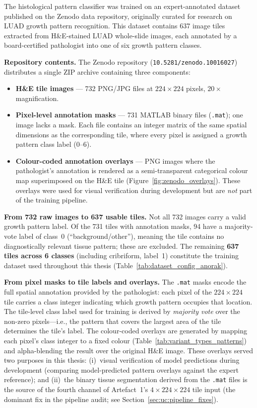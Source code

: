 The histological pattern classifier was trained on an expert-annotated
dataset published on the Zenodo data repository, originally curated for
research on LUAD growth pattern recognition.
This dataset contains 637 image tiles extracted from H\&E-stained LUAD
whole-slide images, each annotated by a board-certified pathologist into
one of six growth pattern classes.

\textbf{Repository contents.}
The Zenodo repository (\texttt{10.5281/zenodo.10016027}) distributes
a single ZIP archive containing three components:
\begin{itemize}
    \item \textbf{H\&E tile images} --- 732 PNG/JPG files at
    $224 \times 224$ pixels, $20\times$ magnification.
    \item \textbf{Pixel-level annotation masks} --- 731 MATLAB
    binary files (\texttt{.mat}); one image lacks a mask.
    Each file contains an integer matrix of the same spatial
    dimensions as the corresponding tile, where every pixel is
    assigned a growth pattern class label (0--6).
    \item \textbf{Colour-coded annotation overlays} --- PNG images
    where the pathologist's annotation is rendered as a
    semi-transparent categorical colour map superimposed on the H\&E
    tile (Figure~\ref{fig:zenodo_overlays}).
    These overlays were used for visual verification during development
    but are \emph{not} part of the training pipeline.
\end{itemize}

\textbf{From 732 raw images to 637 usable tiles.}
Not all 732 images carry a valid growth pattern label.
Of the 731 tiles with annotation masks, 94 have a majority-vote label
of class~0 (``background/other''), meaning the tile contains no
diagnostically relevant tissue pattern; these are excluded.
The remaining \textbf{637 tiles across 6 classes} (including
cribriform, label~1) constitute the training dataset used
throughout this thesis (Table~\ref{tab:dataset_config_anorak}).

\textbf{From pixel masks to tile labels and overlays.}
The \texttt{.mat} masks encode the full spatial annotation provided by
the pathologist: each pixel of the $224 \times 224$ tile carries a
class integer indicating which growth pattern occupies that location.
The tile-level class label used for training is derived by
\emph{majority vote} over the non-zero pixels---i.e., the pattern that
covers the largest area of the tile determines the tile's label.
The colour-coded overlays are generated by
mapping each pixel's class integer to a fixed colour
(Table~\ref{tab:variant_types_patterns}) and alpha-blending the
result over the original H\&E image.
These overlays served two purposes in this thesis:
(i)~visual verification of model predictions during development
(comparing model-predicted pattern overlays against the expert
reference);
and (ii)~the binary tissue segmentation derived from the
\texttt{.mat} files is the source of the fourth channel of
Artefact~1's $4\times 224\times 224$ tile input (the dominant fix in
the pipeline audit; see Section~\ref{sec:uc:pipeline_fixes}).

